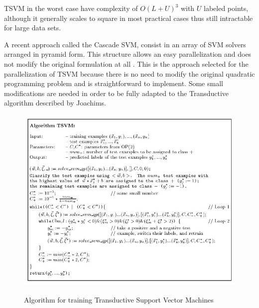 TSVM in the worst case have complexity of $O(L+U)^{3}$ with $U$
labeled points, although it generally scales to square in most practical
cases \cite{Joachims/99a} thus still intractable for large data sets.

A recent approach called the Cascade SVM, consist in an array of SVM
solvers arranged in pyramid form. This structure allows an easy parallelization
and does not modify the original formulation at all \cite{GrafCBDV04,ZhangZY05}.
This is the approach selected for the parallelization of TSVM because
there is no need to modify the original quadratic programming problem
and is straightforward to implement. Some small modifications are
needed in order to be fully adapted to the Transductive algorithm
described by Joachims. 
%
\begin{figure}[H]
\begin{centering}
\includegraphics[scale=0.3]{images/joachims-algorithm}\label{fig:alg-tsvm}
\par\end{centering}
\caption{Algorithm for training Transductive Support Vector Machines \cite{Joachims99c}}
\end{figure}
